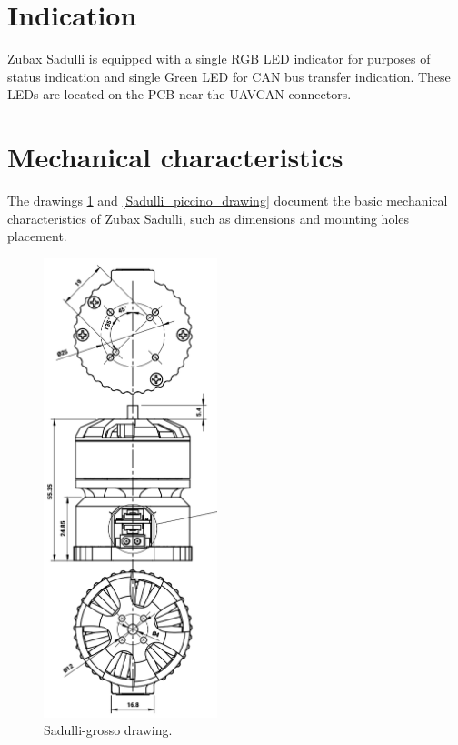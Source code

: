 \documentclass{zubaxdoc}
\begin{document}
\section{Indication}

Zubax Sadulli is equipped with a single RGB LED indicator for purposes of status indication and single Green LED for CAN bus transfer indication. 
These LEDs are located on the PCB near the UAVCAN connectors.

\section{Mechanical characteristics}

The drawings \ref{Sadulli_grosso_drawing} and \ref{Sadulli_piccino_drawing} document the basic mechanical characteristics of Zubax Sadulli,
such as dimensions and mounting holes placement.

\begin{figure}[hb]
    \centering    
    \includegraphics[width=0.45\textwidth]{Sadulli_grosso_Drawing}
    \caption{Sadulli-grosso drawing.} \label{Sadulli_grosso_drawing} 
\end{figure}
\end{document}

